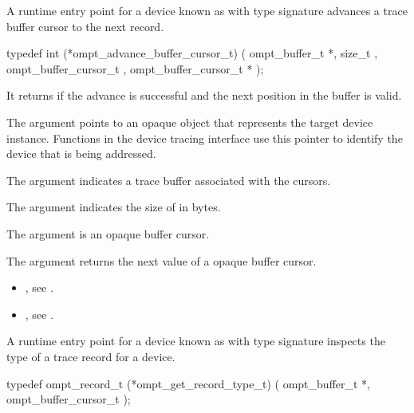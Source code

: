 \summary
A runtime entry point for a device known as 
with type signature 
advances a trace buffer cursor to the next record.

\format
\begin{ccppspecific}
\begin{omptInquiry}
typedef int (*ompt_advance_buffer_cursor_t) (
  ompt_buffer_t *,
  size_t ,
  ompt_buffer_cursor_t ,
  ompt_buffer_cursor_t *
);
\end{omptInquiry}
\end{ccppspecific}

\descr
It returns  if the advance is successful and the next
position in the buffer is valid.

\argdesc
The  argument points to an opaque object that represents
the target device instance. Functions in the device tracing interface
use this pointer to identify the device that is being addressed.

The argument  indicates a trace buffer associated
with the cursors.

The argument  indicates the size of  in
bytes.

The argument  is an opaque buffer cursor.

The argument  returns the next value of a opaque buffer cursor.


\crossreferences
\begin{itemize}
\item {},
see .
\item {},
see .
\end{itemize}

\label{sec:ompt_get_record_type_t}

\summary
A runtime entry point for a device known as
 with type signature
 inspects the type
of a trace record for a device.

\format
\begin{ccppspecific}
\begin{omptInquiry}
typedef ompt_record_t (*ompt_get_record_type_t) (
  ompt_buffer_t *,
  ompt_buffer_cursor_t 
);
\end{omptInquiry}
\end{ccppspecific}

